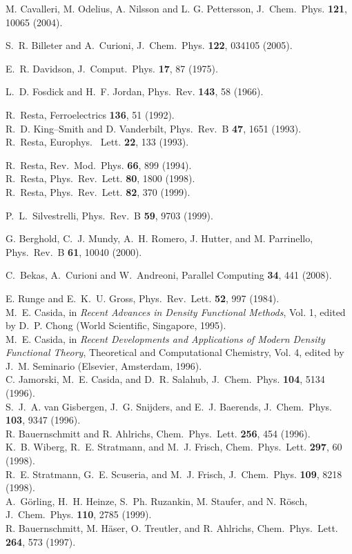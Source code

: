 \documentclass[twoside,10pt,titlepage,a4paper]{article}
\begin{document}
\begin{thebibliography}{999}
 M. Cavalleri, M. Odelius, A. Nilsson and L. G. Pettersson,
     J.~Chem.~Phys. {\bf 121}, 10065 (2004).

    S.~R. Billeter and A.~Curioni,
    J.~Chem.~Phys. {\bf 122}, 034105 (2005).

 E.~R. Davidson,
     J.~Comput.~Phys. {\bf 17}, 87 (1975).

    L.~D. Fosdick and H.~F. Jordan,
    Phys.~Rev. {\bf 143}, 58 (1966).

     R.~Resta, Ferroelectrics {\bf 136}, 51 (1992). \\
     R.~D. King--Smith and D. Vanderbilt, Phys.~Rev.~B {\bf 47}, 1651 (1993). \\
     R.~Resta, Europhys.~ Lett. {\bf 22}, 133 (1993).

     R.~Resta, Rev.~Mod.~Phys. {\bf 66}, 899 (1994). \\
     R.~Resta, Phys.~Rev.~Lett. {\bf 80}, 1800 (1998). \\
     R.~Resta, Phys.~Rev.~Lett. {\bf 82}, 370 (1999).

    P.~L.~Silvestrelli, Phys.~Rev.~B {\bf 59}, 9703 (1999).

 G. Berghold, C.~J. Mundy, A.~H. Romero, J. Hutter, and M. Parrinello,
      Phys.~Rev.~B {\bf 61}, 10040 (2000).

    C.~Bekas, A.~Curioni and W.~Andreoni,
    Parallel Computing {\bf 34}, 441 (2008). 

     E. Runge and E.~K.~U. Gross, Phys.~Rev.~Lett. {\bf 52}, 997 (1984). \\
     M.~E. Casida, in {\em Recent Advances in Density Functional Methods}, Vol. 1,
     edited by D.~P. Chong (World Scientific, Singapore, 1995). \\
     M.~E. Casida, in {\em Recent Developments and Applications of Modern
     Density Functional Theory}, Theoretical and Computational Chemistry, Vol. 4,
     edited by J.~M. Seminario (Elsevier, Amsterdam, 1996). \\
     C. Jamorski, M.~E. Casida, and D.~R. Salahub, J.~Chem.~Phys. {\bf 104}, 5134 (1996). \\
     S.~J.~A. van Gisbergen, J.~G. Snijders, and E.~J. Baerends, J.~Chem.~Phys. {\bf 103}, 9347 (1996). \\
     R. Bauernschmitt and R. Ahlrichs, Chem.~Phys.~Lett. {\bf 256}, 454 (1996). \\
     K.~B. Wiberg, R.~E. Stratmann, and M.~J. Frisch, Chem.~Phys.~Lett. {\bf 297}, 60 (1998). \\
     R.~E. Stratmann, G.~E. Scuseria, and M.~J. Frisch, J.~Chem.~Phys. {\bf 109}, 8218 (1998). \\
     A.~G\"orling, H.~H. Heinze, S.~Ph. Ruzankin, M. Staufer, and N. R\"osch,
     J.~Chem.~Phys. {\bf 110}, 2785 (1999). \\
     R. Bauernschmitt, M. H\"aser, O. Treutler, and R. Ahlrichs, Chem.~Phys.~Lett. {\bf 264}, 573 (1997).


\end{thebibliography}
\end{document}
